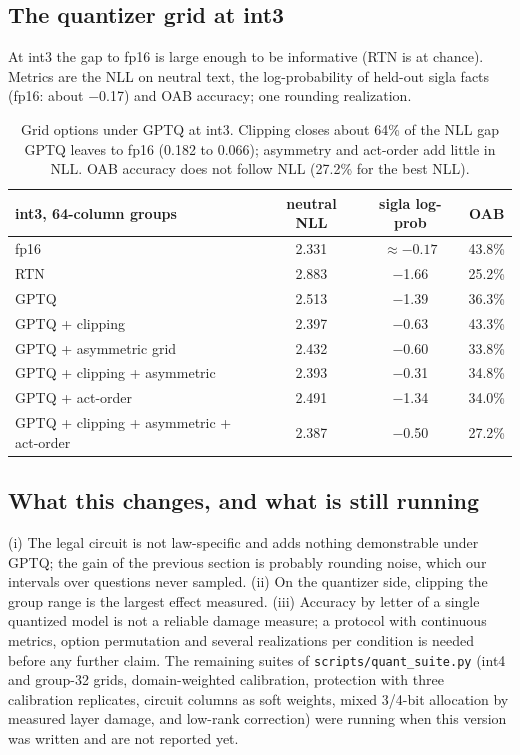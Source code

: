 \documentclass[11pt]{article}
\newcommand{\code}[1]{\texttt{#1}}
\begin{document}
\subsection{The quantizer grid at int3}
At int3 the gap to fp16 is large enough to be informative (RTN is at chance). Metrics are the NLL on neutral text, the log-probability of held-out sigla facts (fp16: about $-$0.17) and OAB accuracy; one rounding realization.
\begin{table}[h]
\centering\small
\begin{tabular}{lccc}
\toprule
int3, 64-column groups & neutral NLL & sigla log-prob & OAB\\
\midrule
fp16 & 2.331 & $\approx-0.17$ & 43.8\%\\
RTN & 2.883 & $-$1.66 & 25.2\%\\
GPTQ & 2.513 & $-$1.39 & 36.3\%\\
GPTQ + clipping & 2.397 & $-$0.63 & 43.3\%\\
GPTQ + asymmetric grid & 2.432 & $-$0.60 & 33.8\%\\
GPTQ + clipping + asymmetric & 2.393 & $-$0.31 & 34.8\%\\
GPTQ + act-order & 2.491 & $-$1.34 & 34.0\%\\
GPTQ + clipping + asymmetric + act-order & 2.387 & $-$0.50 & 27.2\%\\
\bottomrule
\end{tabular}
\caption{Grid options under GPTQ at int3. Clipping closes about 64\% of the NLL gap GPTQ leaves to fp16 (0.182 to 0.066); asymmetry and act-order add little in NLL. OAB accuracy does not follow NLL (27.2\% for the best NLL).}
\label{tab:grid}
\end{table}

\subsection{What this changes, and what is still running}
(i) The legal circuit is not law-specific and adds nothing demonstrable under GPTQ; the gain of the previous section is probably rounding noise, which our intervals over questions never sampled. (ii) On the quantizer side, clipping the group range is the largest effect measured. (iii) Accuracy by letter of a single
quantized model is not a reliable damage measure; a protocol with continuous metrics, option permutation and several realizations per condition is needed before any further claim. The remaining suites of \code{scripts/quant\_suite.py} (int4 and group-32 grids, domain-weighted calibration, protection with three calibration replicates,
circuit columns as soft weights, mixed 3/4-bit allocation by measured layer damage, and low-rank correction) were running when this version was written and are not reported yet.
\end{document}
